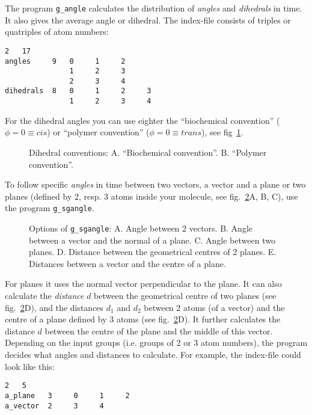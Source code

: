 The program {\tt g\_angle} calculates the distribution of {\em angles} and 
{\em dihedrals} in time. It also gives the average angle or dihedral. 
The index-file consists of triples or quatriples of atom numbers:
\begin{verbatim}
2   17
angles     9   0     1     2
               1     2     3
               2     3     4
dihedrals  8   0     1     2     3
               1     2     3     4
\end{verbatim}
For the dihedral angles you can use eighter the ``biochemical convention'' 
($\phi = 0 \equiv cis$) or ``polymer convention'' ($\phi = 0 \equiv trans$), 
see fig~\ref{fig:dih_def}.
%
\begin{figure}
\centerline{
{}}
\caption{Dihedral conventions: A. ``Biochemical convention''. B. ``Polymer convention''.}
\label{fig:dih_def}
\end{figure}
%

To follow specific {\em angles} in time between two vectors, a vector and 
a plane or 
two planes (defined by 2, resp. 3 atoms inside your molecule, see 
fig.~\ref{fig:sgangle}A, B, C), use the program {\tt g\_sgangle}. 
%
\begin{figure}
\centerline{
{}}
\caption[Options of {\tt g\_sgangle}.]{Options of {\tt g\_sgangle}: A. Angle between 2 vectors. B. Angle between a vector and the normal of a plane. C. Angle between two planes. D. Distance between the geometrical centres of 2 planes. E. Distances between a vector and the centre of a plane.}
\label{fig:sgangle}
\end{figure}
%
For planes it uses the normal vector perpendicular to the plane. 
It can also calculate the {\em distance} $d$ between the geometrical centre 
of two planes (see fig.~\ref{fig:sgangle}D), and the distances 
$d_1$ and $d_2$ between 2 atoms (of a vector) and the centre of a plane 
defined by 3 atoms (see fig.~\ref{fig:sgangle}D). It further calculates the 
distance $d$ between the centre of the plane and the middle of this vector. 
Depending on the input groups (i.e. groups of 2 or 3 atom numbers), the 
program decides what angles and distances to calculate. For example, the index-file could look like this:
\begin{verbatim}
2   5
a_plane   3     0     1     2
a_vector  2     3     4
\end{verbatim}
%
%
